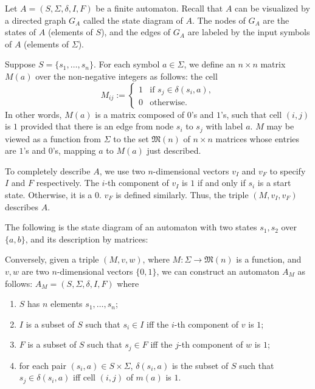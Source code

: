 \documentclass[12pt]{article}
\begin{document}
Let $A=(S,\Sigma,\delta,I,F)$ be a finite automaton.  Recall that $A$ can be visualized by a directed graph $G_A$ called the state diagram of $A$.  The nodes of $G_A$ are the states of $A$ (elements of $S$), and the edges of $G_A$ are labeled by the input symbols of $A$ (elements of $\Sigma$).

Suppose $S=\lbrace s_1,\ldots, s_n\rbrace$.  For each symbol $a\in \Sigma$, we define an $n\times n$ matrix $M(a)$ over the non-negative integers as follows: the cell 
\begin{displaymath}
M_{ij}:= \left\{
\begin{array}{ll}
1 & \textrm{if }s_j\in \delta(s_i,a), \\
0 & \textrm{otherwise.}
\end{array}
\right.
\end{displaymath}
In other words, $M(a)$ is a matrix composed of $0$'s and $1$'s, such that cell $(i,j)$ is $1$ provided that there is an edge from node $s_i$ to $s_j$ with label $a$.  $M$ may be viewed as a function from $\Sigma$ to the set $\mathfrak{M}(n)$ of $n\times n$ matrices whose entries are $1$'s and $0$'s, mapping $a$ to $M(a)$ just described.  

To completely describe $A$, we use two $n$-dimensional vectors $v_I$ and $v_F$ to specify $I$ and $F$ respectively.  The $i$-th component of $v_I$ is $1$ if and only if $s_i$ is a start state.  Otherwise, it is a $0$.  $v_F$ is defined similarly.  Thus, the triple $(M,v_I,v_F)$ describes $A$.

The following is the state diagram of an automaton with two states $s_1,s_2$ over $\lbrace a,b\rbrace$, and its description by matrices:

\begin{figure}[!h]
\centering
{}
\end{figure}

Conversely, given a triple $(M,v,w)$, where $M:\Sigma \to \mathfrak{M}(n)$ is a function, and $v,w$ are two $n$-dimensional vectors $\lbrace 0,1\rbrace$, we can construct an automaton $A_M$ as follows: $A_M=(S,\Sigma,\delta,I,F)$ where 
\begin{enumerate}
\item $S$ has $n$ elements $s_1,\ldots, s_n$;
\item $I$ is a subset of $S$ such that $s_i\in I$ iff the $i$-th component of $v$ is $1$;
\item $F$ is a subset of $S$ such that $s_j\in F$ iff the $j$-th component of $w$ is $1$;
\item for each pair $(s_i,a)\in S\times \Sigma$, $\delta(s_i,a)$ is the subset of $S$ such that $s_j\in \delta(s_i,a)$ iff cell $(i,j)$ of $m(a)$ is $1$.
\end{enumerate}
\end{document}
